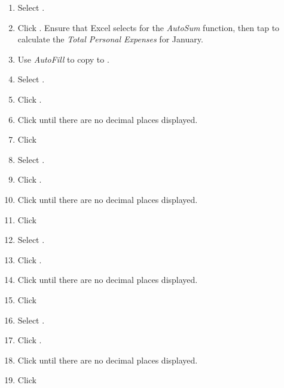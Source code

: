 \begin{enumbox}
\begin{enumerate}
		\item Select .
		\item Click . Ensure that Excel selects  for the \textit{AutoSum} function, then tap  to calculate the \textit{Total Personal Expenses} for January.
		\item Use \textit{AutoFill} to copy  to .
		
		\item Select .
		\item Click .
		\item Click  until there are no decimal places displayed.
		\item Click  
		
		\item Select .
		\item Click .
		\item Click  until there are no decimal places displayed.
		\item Click  
	
		\item Select .
		\item Click .
		\item Click  until there are no decimal places displayed.
		\item Click  
	
		\item Select .
		\item Click .
		\item Click  until there are no decimal places displayed.
		\item Click  
	

\end{enumerate}
\end{enumbox}
